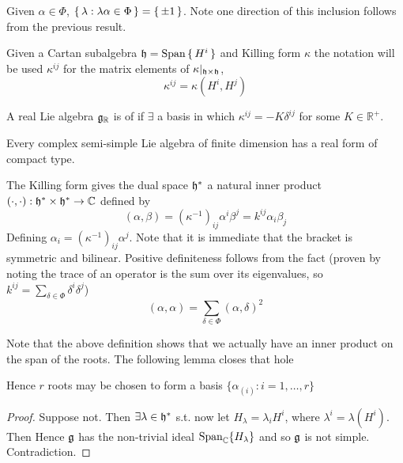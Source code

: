 \documentclass{article}
\begin{document}
\begin{fact}
	Given $\alpha\in\Phi$, $\set{  \lambda : \lambda\alpha\in\Phi  } = \set{  \pm1  }$. Note one direction of this inclusion follows from the previous result. 
\end{fact}

\begin{definition}[$\kappa^{ij}$]
	Given a Cartan subalgebra $\mathfrak{h}=\operatorname{Span}\set{ H^i }$ and Killing form $\kappa$ the notation will be used $\kappa^{ij}$ for the matrix elements of $\kappa |_{\mathfrak{h}\times\mathfrak{h}}$,
	\[
	\kappa^{ij}=\kappa(H^i, H^j)
	\]
\end{definition}

\begin{definition}
	A real Lie algebra $\mathfrak{g}_\mathbb{R}$ is of  if $\exists$ a basis in which $\kappa^{ij}=-K\delta^{ij}$ for some $K\in\mathbb{R}^{+}$.
\end{definition}

\begin{fact}
	Every complex semi-simple Lie algebra of finite dimension has a real form of compact type.
\end{fact}


\begin{definition}
	The Killing form gives the dual space $\mathfrak{h}^\ast$ a natural inner product $(\cdot,\cdot):\mathfrak{h}^\ast \times \mathfrak{h}^\ast \to \mathbb{C}$ defined by 
	\[
	(\alpha, \beta) = \left(\kappa^{-1}\right)_{ij} \alpha^i \beta^j = k^{ij} \alpha_i \beta_j
	\]
	Defining $\alpha_i=\left( \kappa^{-1} \right)_{ij} \alpha^j$. Note that it is immediate that the bracket is symmetric and bilinear. Positive definiteness follows from the fact
	\eq{
		(\alpha,\beta) = \sum_{\delta \in \Phi} (\alpha,\delta) (\beta,\delta)
	}
	(proven by noting the trace of an operator is the sum over its eigenvalues, so $k^{ij} = \sum_{\delta \in \Phi} \delta^i \delta^j$)
	\[
	(\alpha, \alpha)=\sum_{\delta\in\Phi} (\alpha, \delta)^2
	\]
\end{definition}

Note that the above definition shows that we actually have an inner product on the span of the roots. The following lemma closes that hole 
\begin{lemma}
	Hence $r$ roots may be chosen to form a basis $\{ \alpha_{(i)} : i=1,\dots,r \}$
\end{lemma}
\begin{proof}
	Suppose not. Then $\exists \lambda \in \mathfrak{h}^\ast$ s.t. 
	now let $H_\lambda = \lambda_i H^i $, where $\lambda^i = \lambda (H^i)$. Then 
	Hence $\mathfrak{g}$ has the non-trivial ideal $\operatorname{Span}_{\mathbb{C}} \{H_{\lambda}\}$ and so $\mathfrak{g}$ is not simple. Contradiction. 
\end{proof}
\end{document}
